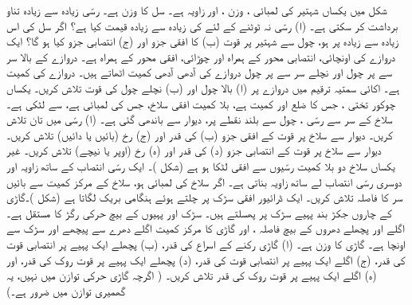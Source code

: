 شکل  میں یکساں شہتیر کی لمبائی  ، وزن  ، اور زاویہ  ہے۔ سل کا وزن  ہے۔  رسّی زیادہ سے زیادہ  تناو برداشت کر سکتی ہے۔ (ا)   رسّی نہ  ٹوٹنے    کے لئے  کی زیادہ سے زیادہ قیمت کیا ہے؟ اگر سل   کی  اس زیادہ سے زیادہ پر ہو، چول سے شہتیر پر قوت (ب)  کا افقی جزو اور (ج) انتصابی جزو کیا ہو گا؟
ایک دروازے کی اونچائی، انتصابی محور  کے  ہمراہ    اور چوڑائی، افقی محور  کے ہمراہ  ہے۔ دروازے کے بالا سر سے  پر چول اور نچلے سر سے  پر چول دروازے کی  آدھی  آدھی  کمیت اٹھاتے ہیں۔ دروازے کی کمیت
  ہے۔ اکائی سمتیہ ترقیم میں  دروازے پر (ا) بالا چول اور (ب) نچلے چول کی قوت تلاش کریں۔
یکساں چوکور تختی ، جس کا ضلع  اور کمیت   ہے،  بلا کمیت افقی سلاخ، جس کی
 لمبائی  ہے، سے لٹکی ہے۔ سلاخ کے سر سے رسّی  ، چول سے   بلند نقطے پر، دیوار  سے   باندھی گئی ہے۔ (ا)  رسّی میں تان تلاش کریں۔ دیوار سے  سلاخ پر قوت  کے افقی جزو  (ب)  کی قدر اور (ج) رخ (بائیں یا دائیں) تلاش کریں۔ دیوار سے سلاخ پر قوت کے  انتصابی  جزو (د) کی قدر اور (ہ) رخ (اوپر یا نیچے) تلاش کریں۔
غیر یکساں سلاخ دو بلا کمیت رسّیوں سے افقی لٹکا ہو ہے (شکل )۔ ایک رسّی انتصاب کے ساتھ  زاویہ اور دوسری  رسّی انتصاب لے ساتھ  زاویہ بناتی ہے۔ اگر سلاخ کی لمبائی  ہو، سلاخ کے مرکز کمیت  سے بائیں سر کا فاصلہ   تلاش کریں۔
ایک ڈرائیور افقی سڑک پر چلتے ہوئے   ہنگامی  بریک لگاتا ہے (شکل )۔گاڑی کے چاروں جکڑ بند  پہیے  سڑک پر پھسلتے ہیں۔ سڑک اور پہیوں کے بیچ حرکی رگڑ کا مستقل  ہے۔ اگلے اور پچھلے دھروں کے بیچ فاصلہ ،  اور گاڑی کا مرکز کمیت اگلے دھرے سے  پیچھے اور سڑک سے   اونچا ہے۔ گاڑی کا وزن  ہے۔ (ا) گاڑی   رکنے کے اسراع  کی قدر، (ب)  پچھلے ایک پہیے پر انتصابی قوت کی قدر،  (ج) اگلے ایک پہیے پر انتصابی قوت کی قدر، (د) پچھلے ایک پہیے پر  قوت روک کی قدر، اور (ہ) اگلے ایک پہیے پر قوت روک کی قدر تلاش کریں۔ ( اگرچہ گاڑی حرکی توازن میں نہیں، یہ گھمیری توازن میں ضرور ہے۔)
